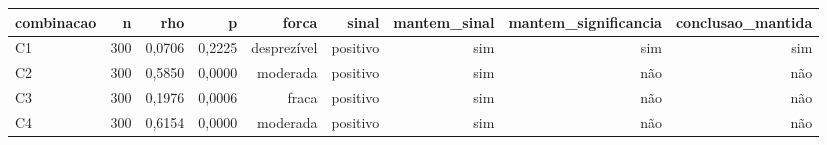 \begin{tabular}{lrrrrrrrr}
\hline
combinacao & n & rho & p & forca & sinal & mantem\_sinal & mantem\_significancia & conclusao\_mantida \\
\hline
C1 & 300 & 0,0706 & 0,2225 & desprezível & positivo & sim & sim & sim \\
C2 & 300 & 0,5850 & 0,0000 & moderada & positivo & sim & não & não \\
C3 & 300 & 0,1976 & 0,0006 & fraca & positivo & sim & não & não \\
C4 & 300 & 0,6154 & 0,0000 & moderada & positivo & sim & não & não \\
\hline
\end{tabular}

